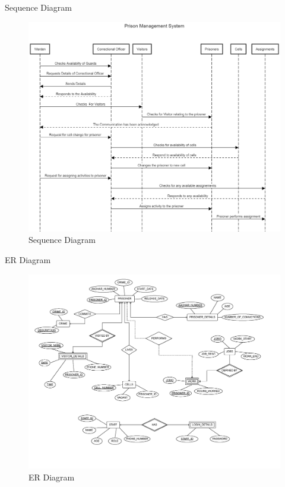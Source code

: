 \documentclass[aspectratio=169]{beamer}
\begin{document}
\begin{frame}{Sequence Diagram}
    \begin{figure}
        \centering
        \includegraphics[scale=0.15]{sequence.png}
        \caption{Sequence Diagram}
        \label{fig:sequence}
    \end{figure}
\end{frame}
\begin{frame}{ER Diagram}
    \begin{figure}
        \centering
        \includegraphics[scale=0.23]{er.png}
        \caption{ER Diagram}
        \label{fig:er}
    \end{figure}
\end{frame}
\end{document}
